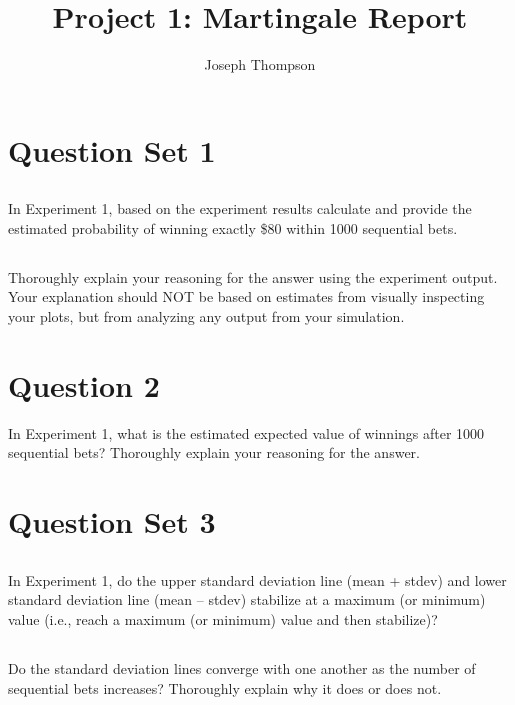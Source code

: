 \documentclass[
	letterpaper, %
]{jdf}
\author{Joseph Thompson}
\title{Project 1: Martingale Report}
\begin{document}

\maketitle

\section{Question Set 1}

\subsection{}
In Experiment 1, based on the experiment results calculate and provide the estimated probability of winning exactly \$80 within 1000 sequential bets.

\subsection{}
Thoroughly explain your reasoning for the answer using the experiment output. Your explanation should NOT be based on estimates from visually inspecting your plots, but from analyzing any output from your simulation.

\section{Question 2}
In Experiment 1, what is the estimated expected value of winnings after 1000 sequential bets? Thoroughly explain your reasoning for the answer. 

\section{Question Set 3}

\subsection{}
In Experiment 1, do the upper standard deviation line (mean + stdev) and lower standard deviation line (mean – stdev) stabilize at a maximum (or minimum) value (i.e., reach a maximum (or minimum) value and then stabilize)?

\subsection{}
Do the standard deviation lines converge with one another as the number of sequential bets increases? Thoroughly explain why it does or does not. 
\end{document}
